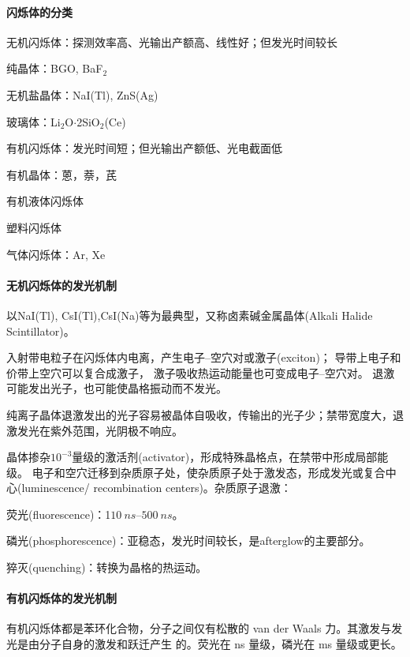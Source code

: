 \paragraph{闪烁体的分类}
\begin{compactitem}
	\item 无机闪烁体：探测效率高、光输出产额高、线性好；但发光时间较长
	\begin{compactitem}
		\item 纯晶体：BGO, BaF$_2$
		\item 无机盐晶体：NaI(Tl), ZnS(Ag)
		\item 玻璃体：Li$_2$O$·$2SiO$_2$(Ce)
	\end{compactitem}
	\item 有机闪烁体：发光时间短；但光输出产额低、光电截面低
	\begin{compactitem}
		\item 有机晶体：蒽，萘，芪
		\item 有机液体闪烁体
		\item 塑料闪烁体
	\end{compactitem}
	\item 气体闪烁体：Ar, Xe
\end{compactitem}
\paragraph{无机闪烁体的发光机制}
以NaI(Tl), CsI(Tl),CsI(Na)等为最典型，又称卤素碱金属晶体(Alkali Halide Scintillator)。

入射带电粒子在闪烁体内电离，产生电子--空穴对或激子(exciton)；
导带上电子和价带上空穴可以复合成激子，
激子吸收热运动能量也可变成电子--空穴对。
退激可能发出光子，也可能使晶格振动而不发光。

纯离子晶体退激发出的光子容易被晶体自吸收，传输出的光子少；禁带宽度大，退激发光在紫外范围，光阴极不响应。

晶体掺杂$10^{-3}$量级的激活剂(activator)，形成特殊晶格点，在禁带中形成局部能级。
电子和空穴迁移到杂质原子处，使杂质原子处于激发态，形成发光或复合中心(luminescence/ recombination centers)。杂质原子退激：
\begin{compactitem}
	\item 荧光(fluorescence)：1$\qtyrange{10}{500}{ns}$。
	\item 磷光(phosphorescence)：亚稳态，发光时间较长，是afterglow的主要部分。
	\item 猝灭(quenching)：转换为晶格的热运动。
\end{compactitem}
\paragraph{有机闪烁体的发光机制}
有机闪烁体都是苯环化合物，分子之间仅有松散的 van der Waals 力。其激发与发光是由分子自身的激发和跃迁产生
的。荧光在 \unit{ns} 量级，磷光在 \unit{ms} 量级或更长。

